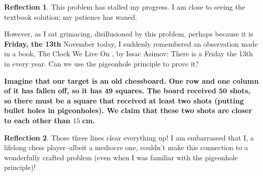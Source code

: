 \documentclass[11pt]{book}
\theoremstyle{definition}
\theoremstyle{plain}
\theoremstyle{definition}
\theoremstyle{problemstyle}
\theoremstyle{remark}
\theoremstyle{definition}
\newtheorem{reflection}{Reflection}
\begin{document}
\begin{reflection}
    This problem has stalled my progress. I am close to seeing the textbook solution; my patience has waned.

    However, as I sat grimacing, disillusioned by this problem, perhaps because it is \textbf{Friday, the 13th} November today, I suddenly remembered an observation made in a book, The Clock We Live On \cite{asimov-clock}, by Issac Asimov: There is a Friday the 13th in every year. Can we use the pigeonhole principle to prove it?
\end{reflection}

\textbf{
    Imagine that our target is an old chessboard. One row and one column of it has fallen off, so it has $\boldsymbol{49}$ squares. The board received $\boldsymbol{50}$ shots, so there must be a square that received at least two shots (putting bullet holes in pigeonholes). We claim that these two shots are closer to each other than $15\;$cm.
}
\begin{reflection}
    Those three lines clear everything up! I am embarrassed that I, a lifelong chess player--albeit a mediocre one, couldn't make this connection to a wonderfully crafted problem (even when I was familiar with the pigeonhole principle)!
\end{reflection}
\end{document}

